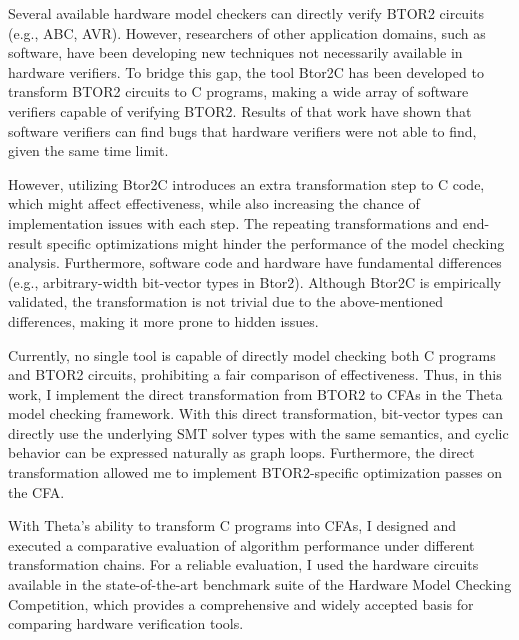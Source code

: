 Several available hardware model checkers can directly verify BTOR2 circuits (e.g., ABC, AVR). However, researchers of other application domains, such as software, have been developing new techniques not necessarily available in hardware verifiers. To bridge this gap, the tool Btor2C has been developed to transform BTOR2 circuits to C programs, making a wide array of software verifiers capable of verifying BTOR2. Results of that work have shown that software verifiers can find bugs that hardware verifiers were not able to find, given the same time limit.  

However, utilizing Btor2C introduces an extra transformation step to C code, which might affect effectiveness, while also increasing the chance of implementation issues with each step. The repeating transformations and end-result specific optimizations might hinder the performance of the model checking analysis. Furthermore, software code and hardware have fundamental differences (e.g., arbitrary-width bit-vector types in Btor2). Although Btor2C is empirically validated, the transformation is not trivial due to the above-mentioned differences, making it more prone to hidden issues.  

Currently, no single tool is capable of directly model checking both C programs and BTOR2 circuits, prohibiting a fair comparison of effectiveness. Thus, in this work, I implement the direct transformation from BTOR2 to CFAs in the Theta model checking framework. With this direct transformation, bit-vector types can directly use the underlying SMT solver types with the same semantics, and cyclic behavior can be expressed naturally as graph loops. Furthermore, the direct transformation allowed me to implement BTOR2-specific optimization passes on the CFA.  

With Theta’s ability to transform C programs into CFAs, I designed and executed a comparative evaluation of algorithm performance under different transformation chains. For a reliable evaluation, I used the hardware circuits available in the state-of-the-art benchmark suite of the Hardware Model Checking Competition, which provides a comprehensive and widely accepted basis for comparing hardware verification tools. 

\vfill
\cleardoublepage

\selectthesislanguage


